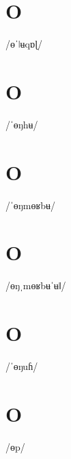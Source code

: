 \documentclass[10pt,a4paper,twoside]{book}
\begin{document}
\section*{O}

\begin{multicols}{3}
 {/ɵˈǀʉqɒɭ/} {}
\end{multicols}

\section*{O}

\begin{multicols}{3}
 {/ˈɵŋhʉ/} {}
\end{multicols}

\section*{O}

\begin{multicols}{3}
 {/ˈɵŋmɵʁbʉ/} {}
\end{multicols}

\section*{O}

\begin{multicols}{3}
 {/ɵŋˌmɵʁbʉˈʉǁ/} {}
\end{multicols}

\section*{O}

\begin{multicols}{3}
 {/ˈɵŋuɦ/} {}
\end{multicols}

\section*{O}

\begin{multicols}{3}
 {/ɵp/} {}
\end{multicols}
\end{document}
